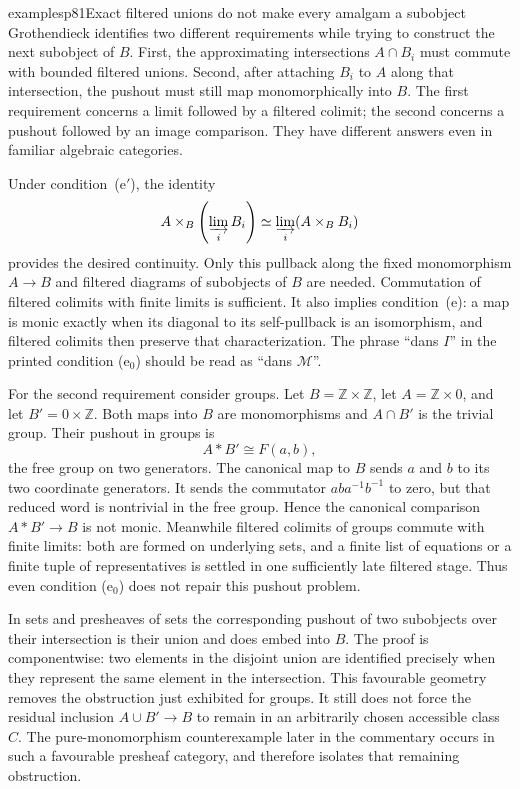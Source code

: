 \begin{dcomment}{examples}{p81}{Exact filtered unions do not make every amalgam a subobject}
Grothendieck identifies two different requirements while trying to construct the next subobject of $B$. First, the approximating intersections $A\cap B_i$ must commute with bounded filtered unions. Second, after attaching $B_i$ to $A$ along that intersection, the pushout must still map monomorphically into $B$. The first requirement concerns a limit followed by a filtered colimit; the second concerns a pushout followed by an image comparison. They have different answers even in familiar algebraic categories.

Under condition~(e$'$), the identity
\[
 A\times_B\left(\varinjlim_iB_i\right)
       \simeq\varinjlim_i(A\times_BB_i)
\]
provides the desired continuity. Only this pullback along the fixed monomorphism $A\to B$ and filtered diagrams of subobjects of $B$ are needed. Commutation of filtered colimits with finite limits is sufficient. It also implies condition~(e): a map is monic exactly when its diagonal to its self-pullback is an isomorphism, and filtered colimits then preserve that characterization. The phrase ``dans $I$'' in the printed condition (e$_0$) should be read as ``dans $\mathcal M$''.

For the second requirement consider groups. Let $B=\mathbb Z\times\mathbb Z$, let $A=\mathbb Z\times0$, and let $B'=0\times\mathbb Z$. Both maps into $B$ are monomorphisms and $A\cap B'$ is the trivial group. Their pushout in groups is
\[
 A*B'\cong F(a,b),
\]
the free group on two generators. The canonical map to $B$ sends $a$ and $b$ to its two coordinate generators. It sends the commutator $aba^{-1}b^{-1}$ to zero, but that reduced word is nontrivial in the free group. Hence the canonical comparison $A*B'\to B$ is not monic. Meanwhile filtered colimits of groups commute with finite limits: both are formed on underlying sets, and a finite list of equations or a finite tuple of representatives is settled in one sufficiently late filtered stage. Thus even condition (e$_0$) does not repair this pushout problem.

In sets and presheaves of sets the corresponding pushout of two subobjects over their intersection is their union and does embed into $B$. The proof is componentwise: two elements in the disjoint union are identified precisely when they represent the same element in the intersection. This favourable geometry removes the obstruction just exhibited for groups. It still does not force the residual inclusion $A\cup B'\to B$ to remain in an arbitrarily chosen accessible class $C$. The pure-monomorphism counterexample later in the commentary occurs in such a favourable presheaf category, and therefore isolates that remaining obstruction.


\end{dcomment}
